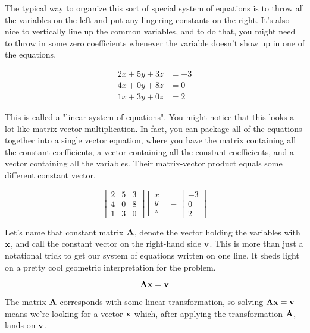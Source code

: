 The typical way to organize this sort of special system of equations is to throw
all the variables on the left and put any lingering constants on the right. It's
also nice to vertically line up the common variables, and to do that, you might
need to throw in some zero coefficients whenever the variable doesn't show up in
one of the equations.

\begin{align*}
  2x + 5y + 3z &= -3 \\
  4x + 0y + 8z &= 0 \\
  1x + 3y + 0z &= 2
\end{align*}

This is called a "linear system of equations". You might notice that this looks
a lot like matrix-vector multiplication. In fact, you can package all of the
equations together into a single vector equation, where you have the matrix
containing all the constant coefficients, a vector containing all the constant
coefficients, and a vector containing all the variables. Their matrix-vector
product equals some different constant vector.

\begin{equation*}
  \begin{bmatrix}
    2 & 5 & 3 \\
    4 & 0 & 8 \\
    1 & 3 & 0
  \end{bmatrix}
  \begin{bmatrix}
    x \\
    y \\
    z
  \end{bmatrix} =
  \begin{bmatrix}
    -3 \\
    0 \\
    2
  \end{bmatrix}
\end{equation*}

Let's name that constant matrix $\mathbf{A}$, denote the vector holding the
variables with $\mathbf{x}$, and call the constant vector on the right-hand side
$\mathbf{v}$. This is more than just a notational trick to get our system of
equations written on one line. It sheds light on a pretty cool geometric
interpretation for the problem.

\begin{equation*}
  \mathbf{A}\mathbf{x} = \mathbf{v}
\end{equation*}

The matrix $\mathbf{A}$ corresponds with some linear transformation, so solving
$\mathbf{A}\mathbf{x} = \mathbf{v}$ means we're looking for a vector $\mathbf{x}$ which,
after applying the transformation $\mathbf{A}$, lands on $\mathbf{v}$.

